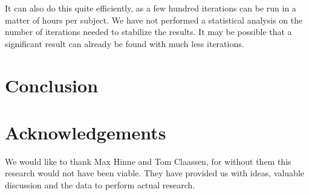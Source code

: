 \documentclass[a4paper, 10pt, english, onecolumn]{article}
\begin{document}
It can also do this quite efficiently, as a few hundred iterations can be run in a matter of hours per subject.
We have not performed a statistical analysis on the number of iterations needed to stabilize the results.
It may be possible that a significant result can already be found with much less iterations.


\section{Conclusion}


\section{Acknowledgements}
We would like to thank Max Hinne and Tom Claassen, for without them this research would not have been viable.
They have provided us with ideas, valuable discussion and the data to perform actual research.

{}

\end{document}

